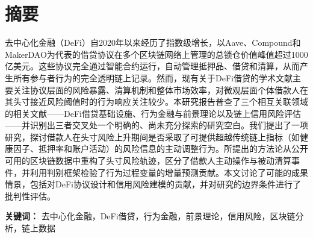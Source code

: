 \section*{摘要}

去中心化金融（DeFi）自2020年以来经历了指数级增长，以Aave、Compound和MakerDAO为代表的借贷协议在多个区块链网络上管理的总锁仓价值峰值超过1000亿美元。这些协议完全通过智能合约运行，自动管理抵押品、借贷和清算，从而产生所有参与者行为的完全透明链上记录。然而，现有关于DeFi借贷的学术文献主要关注协议层面的风险暴露、清算机制和整体市场效率，对微观层面个体借款人在其头寸接近风险阈值时的行为响应关注较少。本研究报告普查了三个相互关联领域的相关文献——DeFi借贷基础设施、行为金融与前景理论以及链上信用风险评估——并识别出三者交叉处一个明确的、尚未充分探索的研究空白。我们提出了一项研究，探讨借款人在头寸风险上升期间是否采取了可提供超越传统链上指标（如健康因子、抵押率和账户活动）的风险信息的主动调整行为。所提出的方法论从公开可用的区块链数据中重构了头寸风险轨迹，区分了借款人主动操作与被动清算事件，并利用判别框架检验了行为过程变量的增量预测贡献。本文讨论了可能的成果情景，包括对DeFi协议设计和信用风险建模的贡献，并对研究的边界条件进行了批判性评估。

\vspace{8pt}
\noindent\textbf{关键词：} 去中心化金融，DeFi借贷，行为金融，前景理论，信用风险，区块链分析，链上数据

